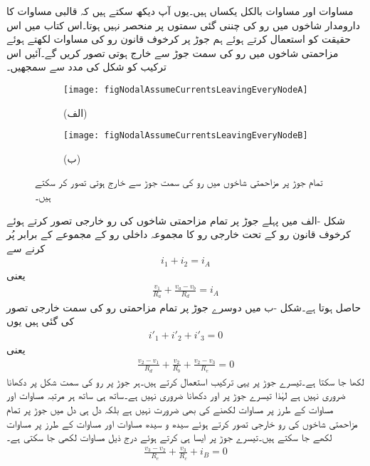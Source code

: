 مساوات  اور مساوات  بالکل یکساں ہیں۔یوں آپ دیکھ سکتے ہیں کہ قالبی مساوات کا دارومدار شاخوں میں رو کی چننی گئی سمتوں پر منحصر نہیں ہوتا۔اس کتاب میں اس حقیقت کو استعمال کرتے ہوئے ہم جوڑ پر کرخوف قانون رو کی مساوات لکھتے ہوئے مزاحمتی شاخوں میں رو کی سمت جوڑ سے خارج ہوتی تصور کریں گے۔آئیں اس ترکیب کو شکل  کی مدد سے سمجھیں۔
\begin{figure}
\centering
\begin{subfigure}{\textwidth}
\centering
\texttt{[image: figNodalAssumeCurrentsLeavingEveryNodeA]}
\caption*{(الف)}
\end{subfigure}
\begin{subfigure}{\textwidth}
\centering
\texttt{[image: figNodalAssumeCurrentsLeavingEveryNodeB]}
\caption*{(ب)}
\end{subfigure}
\caption{تمام جوڑ پر مزاحمتی شاخوں میں رو کی سمت جوڑ سے خارج ہوتی تصور کر سکتے ہیں۔}
\label{شکل_جوڑ_شاخوں_کی_رو_خارجی}
\end{figure}%

شکل -الف میں پہلے جوڑ پر تمام مزاحمتی شاخوں کی رو خارجی تصور کرتے ہوئے کرخوف قانون رو کے تحت خارجی رو کا مجموعہ داخلی رو کے مجموعے کے برابر پُر کرنے سے
\begin{align}\label{مساوات_جوڑ_رو_خارجی_الف}
i_1+i_2=i_A
\end{align}
یعنی
\begin{align}\label{مساوات_جوڑ_رو_خارجی_ب}
\frac{v_1}{R_a}+\frac{v_a-v_b}{R_d}=i_A
\end{align}
حاصل ہوتا ہے۔شکل -ب میں دوسرے جوڑ پر تمام مزاحمتی رو کی سمت خارجی تصور کی گئی ہیں یوں
\begin{align}\label{مساوات_جوڑ_رو_خارجی_پ}
i'_1+i'_2+i'_3=0
\end{align}
یعنی
\begin{align}\label{مساوات_جوڑ_رو_خارجی_ت}
\frac{v_2-v_1}{R_d}+\frac{v_2}{R_b}+\frac{v_2-v_3}{R_e}=0
\end{align}
لکھا جا سکتا ہے۔تیسرے جوڑ پر یہی ترکیب استعمال کرتے ہیں۔ہر جوڑ پر رو کی سمت شکل پر دکھانا ضروری نہیں ہے لہٰذا تیسرے جوڑ پر  اور  دکھانا ضروری نہیں ہے۔ساتھ ہی ساتھ ہر مرتبہ مساوات  اور مساوات  کے طرز پر مساوات لکھنے کی بھی ضرورت نہیں ہے بلکہ دل ہی دل میں جوڑ پر تمام مزاحمتی شاخوں کی رو خارجی تصور کرتے ہوئے سیدھ و سیدھ  مساوات  اور مساوات  کے طرز پر مساوات لکھے جا سکتے ہیں۔تیسرے جوڑ پر ایسا ہی کرتے ہوئے درج ذیل مساوات لکھی جا سکتی ہے۔
\begin{align}\label{مساوات_جوڑ_رو_خارجی_ٹ}
\frac{v_3-v_2}{R_e}+\frac{v_3}{R_c}+i_B=0
\end{align}

